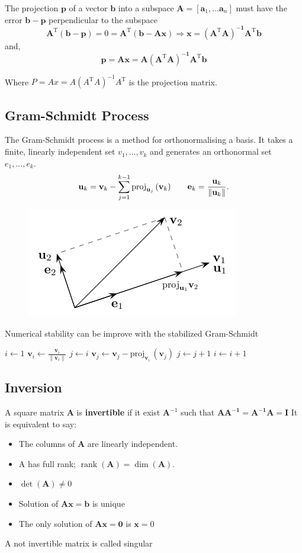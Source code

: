 \documentclass[twocolumn]{article}
\numberwithin{equation}{section}
\begin{document}
The projection $\mathbf{p}$ of a vector $\mathbf{b}$ into a subspace $\mathbf{A}=[\mathbf{a}_1,...\mathbf{a}_n]$ must have the error $\mathbf{b-p}$ perpendicular to the subspace
$$\mathbf{A^\mathrm{T}(b-p)}=0=\mathbf{A^\mathrm{T}(b-Ax)} \Rightarrow \mathbf{x= (A^\mathrm{T}A)^{-1}A^\mathrm{T}b}$$
and,
$$\mathbf{p=Ax=A(A^\mathrm{T}A)^{-1}A^\mathrm{T}b}$$

Where $P=Ax=A(A^\mathrm{T}A)^{-1}A^\mathrm{T}$ is the projection matrix.

	\subsection{Gram-Schmidt Process}
The Gram-Schmidt process is a method for orthonormalising a basis. It takes a finite, linearly independent set ${v_1, \ldots, v_k}$ and generates an orthonormal set ${e_1, ..., e_k}$.
$$ \mathbf{u}_k  = \mathbf{v}_k-\sum_{j=1}^{k-1}\mathrm{proj}_{\mathbf{u}_j}\,(\mathbf{v}_k) \qquad \mathbf{e}_k = {\mathbf{u}_k\over \|\mathbf{u}_k \|}.
$$
\begin{figure}[H]
\centering
    \includegraphics[width=.30\textwidth]{GramSchmidtprocess.png}
\end{figure}
Numerical stability can be improve with the stabilized Gram-Schmidt
\begin{framed}\begin{algorithmic}
\State $i\gets 1$
	\State $\mathbf{v}_i \gets \frac{\mathbf{v}_i}{\|\mathbf{v}_i\|}$  
	\State $j\gets i$
		\State $ \mathbf{v}_j \leftarrow \mathbf{v}_j - \mathrm{proj}_{\mathbf{v}_{i}} \, (\mathbf{v}_j)$  
		\State $j\gets j+1$
	\EndFor
\State $i\gets i+1$
\EndWhile
\end{algorithmic}\end{framed}


	\subsection{Inversion}
A square matrix $\mathbf{A}$ is \textbf{invertible} if it exist $\mathbf{A}^{-1}$ such that $\mathbf{AA^{-1}} = \mathbf{A^{-1}A} = \mathbf{I}$
It is equivalent to say:
\begin{itemize}
	\item The columns of $\mathbf{A}$ are linearly independent.
	\item A has full rank; $\operatorname{rank}(\mathbf{A}) = \dim(\mathbf{A})$.
	\item $\det(\mathbf{A}) \neq 0$
	\item Solution of $\mathbf{Ax=b}$ is unique
	\item The only solution of $\mathbf{Ax=0}$ is $\mathbf{x}=0$
\end{itemize}
A not invertible matrix is called singular
	
\end{document}
